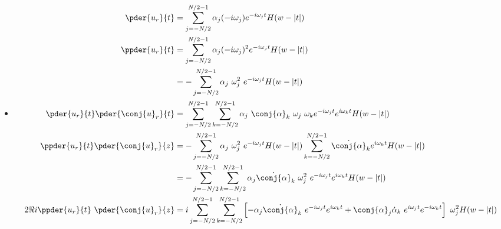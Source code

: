 \begin{itemize}
\begin{equation}
\begin{split}
 \end{split}
 \end{equation}
 \item 
 \begin{equation}
 \begin{split}
        \pder{u_r}{t} &= \sum_{j=-N/2}^{N/2 - 1} \alpha_j (-i \omega_j) e^{-i \omega_j t} H(w-|t|)\\
        \ppder{u_r}{t} &= \sum_{j=-N/2}^{N/2 - 1} \alpha_j (-i \omega_j)^2 e^{-i \omega_j t} H(w-|t|)\\
               &= -\sum_{j=-N/2}^{N/2 - 1} \alpha_j \ \omega_j^2 \ e^{-i \omega_j t} H(w-|t|)\\
        \pder{u_r}{t}\pder{\conj{u}_r}{t} &= \sum_{j=-N/2}^{N/2 - 1}\sum_{k=-N/2}^{N/2 - 1} \alpha_j \ \conj{\alpha}_k \ \omega_j \ \omega_k e^{-i \omega_j t}e^{i \omega_k t} H(w-|t|)\\
        \ppder{u_r}{t}\pder{\conj{u}_r}{z} &= -\sum_{j=-N/2}^{N/2 - 1} \alpha_j \ \omega_j^2 \ e^{-i \omega_j t} H(w-|t|) \sum_{k=-N/2}^{N/2 - 1} \dot{\conj{\alpha}}_k e^{i \omega_k t} H(w-|t|)\\
        &= -\sum_{j=-N/2}^{N/2 - 1}\sum_{k=-N/2}^{N/2 - 1} \alpha_j\dot{\conj{\alpha}}_k \ \omega_j^2 \ e^{-i \omega_j t} e^{i \omega_k t} H(w-|t|)\\
        2\Re{i \ppder{u_r}{t} \ \pder{\conj{u}_r}{z} }  &= i\sum_{j=-N/2}^{N/2 - 1}\sum_{k=-N/2}^{N/2 - 1} \left[-\alpha_j\dot{\conj{\alpha}}_k \ e^{-i \omega_j t} e^{i \omega_k t} + \conj{\alpha}_j\dot{\alpha}_k \ e^{i \omega_j t} e^{-i \omega_k t}\right] \ \omega_j^2  H(w-|t|)\\
\end{split}
 \end{equation}
\end{itemize}
